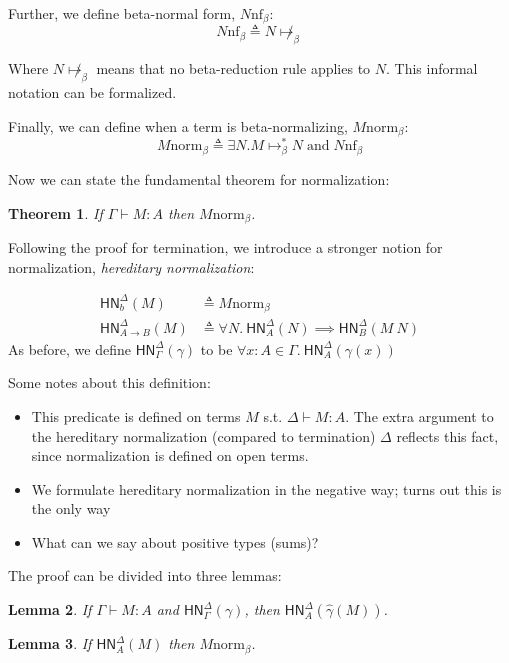 \documentclass{article}
\newtheorem{thm}{Theorem}
\newtheorem{lem}[thm]{Lemma}
\newcommand{\hasEF}[3]{\ensuremath{#1 \vdash #2 : #3}}
\newcommand{\bnf}[1]{#1 \mathrel{\text{nf}_\beta}}
\newcommand{\bnorm}[1]{#1 \mathrel{\text{norm}_\beta}}
\newcommand{\stepbs}[2]{\ensuremath{#1 \mapsto_{\beta}^* #2}}
\newcommand{\hnorm}[3]{\ensuremath{\mathsf{HN}^{#1}_{#2}(#3)}}
\newcommand{\fn}[2]{\ensuremath{#1 \to #2}}
\newcommand{\ap}[2]{\ensuremath{#1\ #2}}
\begin{document}
Further, we define beta-normal form, $\bnf{N}$:
\[
\bnf{N} \triangleq N \not\mapsto_{\beta}
\]

Where $N \not\mapsto_{\beta}$ means that no beta-reduction rule applies to $N$. This informal notation can be formalized.

Finally, we can define when a term is beta-normalizing, $\bnorm{M}$: 
\[
\bnorm{M} \triangleq \exists N. \stepbs{M}{N} \;\text{and}\; \bnf{N}
\]

Now we can state the fundamental theorem for normalization: 
\begin{thm}
If $\hasEF{\Gamma}{M}{A}$ then $\bnorm{M}$.
\end{thm}

Following the proof for termination, we introduce a stronger notion for normalization, \emph{hereditary normalization}:

\begin{align*}
  \hnorm{\Delta}{b}{M} &\triangleq \bnorm{M}\\
  \hnorm{\Delta}{\fn{A}{B}}{M} &\triangleq
  \forall N.\ \hnorm{\Delta}{A}{N} \implies \hnorm{\Delta}{B}{\ap{M}{N}}
\end{align*}
As before, we define $\hnorm{\Delta}{\Gamma}{\gamma}$ to be $\forall x : A \in \Gamma.\ \hnorm{\Delta}{A}{\gamma(x)}$

Some notes about this definition:
\begin{itemize}
\setlength\itemsep{1em}
\item This predicate is defined on terms $M$ s.t. $\hasEF{\Delta}{M}{A}$. The extra argument to the hereditary normalization (compared to termination) $\Delta$ reflects this fact, since normalization is defined on open terms. \\
\item We formulate hereditary normalization in the negative way; turns out this is the only way\\
\item What can we say about positive types (sums)?
\end{itemize}

The proof can be divided into three lemmas: 
\begin{lem}\label{l1}
If $\hasEF{\Gamma}{M}{A}$ and $\hnorm{\Delta}{\Gamma}{\gamma}$, then $\hnorm{\Delta}{A}{\hat\gamma(M)}$.
\end{lem}

\begin{lem}\label{l2}
If $\hnorm{\Delta}{A}{M}$ then $\bnorm{M}$.
\end{lem}
\end{document}
